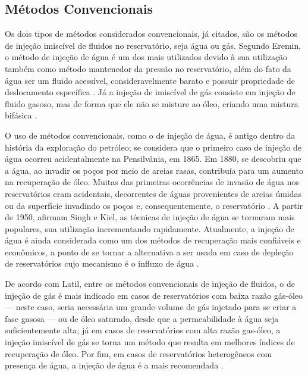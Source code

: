 \subsection{M\'{e}todos Convencionais}
Os dois tipos de m\'{e}todos considerados convencionais, j\'{a} citados, s\~{a}o os m\'{e}todos de inje\c{c}\~{a}o imisc\'{i}vel de fluidos no reservat\'{o}rio, seja \'{a}gua ou g\'{a}s. Segundo Eremin, o m\'{e}todo de inje\c{c}\~{a}o de \'{a}gua \'{e} um dos mais utilizados devido \`{a} sua utiliza\c{c}\~{a}o tamb\'{e}m como m\'{e}todo mantenedor da press\~{a}o no reservat\'{o}rio, al\'{e}m do fato da \'{a}gua ser um fluido acess\'{i}vel, consideravelmente barato e possuir propriedade de deslocamento espec\'{i}fica \cite{eremin}. J\'{a} a inje\c{c}\~{a}o de imisc\'{i}vel de g\'{a}s consiste em inje\c{c}\~{a}o de fluido gasoso, mas de forma que ele n\~{a}o se misture ao \'{o}leo, criando uma mistura bif\'{a}sica \cite[p. 564]{engres}.

O uso de m\'{e}todos convencionais, como o de inje\c{c}\~{a}o de \'{a}gua, \'{e} antigo dentro da hist\'{o}ria da explora\c{c}\~{a}o do petr\'{o}leo; se considera que o primeiro caso de inje\c{c}\~{a}o de \'{a}gua ocorreu acidentalmente na Pensilv\^{a}nia, em 1865. Em 1880, se descobriu que a \'{a}gua, ao invadir os po\c{c}os por meio de areias rasas, contribu\'{i}a para um aumento na recupera\c{c}\~{a}o de \'{o}leo. Muitas das primeiras ocorr\^{e}ncias de invas\~{a}o de \'{a}gua nos reservat\'{o}rios eram acidentais, decorrentes de \'{a}guas provenientes de areias \'{u}midas ou da superf\'{i}cie invadindo os po\c{c}os e, consequentemente, o reservat\'{o}rio \cite{adeniyi2008}. A partir de 1950, afirmam Singh e Kiel, as t\'{e}cnicas de inje\c{c}\~{a}o de \'{a}gua se tornaram mais populares, sua utiliza\c{c}\~{a}o incrementando rapidamente. Atualmente, a inje\c{c}\~{a}o de \'{a}gua \'{e} ainda considerada como um dos m\'{e}todos de recupera\c{c}\~{a}o mais confi\'{a}veis e econ\^{o}micos, a ponto de se tornar a alternativa a ser usada em caso de deple\c{c}\~{a}o de reservat\'{o}rios cujo mecanismo \'{e} o influxo de \'{a}gua \cite{singh1982}.


De acordo com Latil, entre os m\'{e}todos convencionais de inje\c{c}\~{a}o de fluidos, o de inje\c{c}\~{a}o de g\'{a}s \'{e} mais indicado em casos de reservat\'{o}rios com baixa raz\~{a}o g\'{a}s-\'{o}leo --- neste caso, seria necess\'{a}ria um grande volume de g\'{a}s injetado para se criar a fase gasosa --- ou de \'{o}leo saturado, desde que a permeabilidade \`{a} \'{a}gua seja suficientemente alta; j\'{a} em casos de reservat\'{o}rios com alta raz\~{a}o gas-\'{o}leo, a inje\c{c}\~{a}o imisc\'{i}vel de g\'{a}s se torna um m\'{e}todo que resulta em melhores \'{i}ndices de recupera\c{c}\~{a}o de \'{o}leo. Por fim, em casos de reservat\'{o}rios heterog\^{e}neos com presen\c{c}a de \'{a}gua, a inje\c{c}\~{a}o de \'{a}gua \'{e} a mais recomendada \cite{latil}. 

